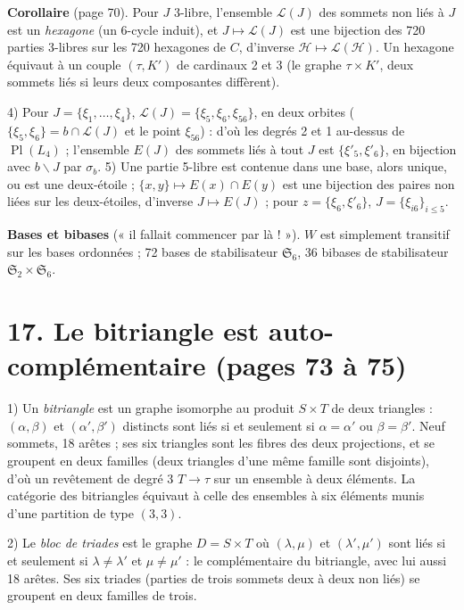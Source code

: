 \documentclass[11pt,a4paper]{article}
\begin{document}
\textbf{Corollaire} (page 70). Pour $J$ 3-libre, l'ensemble $\mathcal{L}(J)$
des sommets non liés à $J$ est un \emph{hexagone} (un 6-cycle induit), et $J
\mapsto \mathcal{L}(J)$ est une bijection des 720 parties 3-libres sur les 720
hexagones de $C$, d'inverse $\mathcal{H} \mapsto \mathcal{L}(\mathcal{H})$. Un
hexagone équivaut à un couple $(\tau, K')$ de cardinaux 2 et 3 (le graphe
$\tau \times K'$, deux sommets liés si leurs deux composantes diffèrent).

4) Pour $J = \lbrace \xi_1, \ldots, \xi_4\rbrace$, $\mathcal{L}(J) = \lbrace
\xi_5, \xi_6, \xi_{56}\rbrace$, en deux orbites ($\lbrace \xi_5, \xi_6\rbrace =
b \cap \mathcal{L}(J)$ et le point $\xi_{56}$) : d'où les degrés 2 et 1 au-dessus
de $\operatorname{Pl}(L_4)$ ; l'ensemble $E(J)$ des sommets liés à tout $J$ est
$\lbrace \xi'_5, \xi'_6\rbrace$, en bijection avec $b \smallsetminus J$ par
$\sigma_b$. 5) Une partie 5-libre est contenue dans une base, alors unique, ou
est une deux-étoile ; $\lbrace x, y\rbrace \mapsto E(x) \cap E(y)$ est une
bijection des paires non liées sur les deux-étoiles, d'inverse $J \mapsto
E(J)$ ; pour $z = \lbrace \xi_6, \xi'_6\rbrace$, $J = \lbrace \xi_{i6}\rbrace_{i
\leq 5}$.

\textbf{Bases et bibases} (« il fallait commencer par là ! »). $W$ est
simplement transitif sur les bases ordonnées ; 72 bases de stabilisateur
$\mathfrak{S}_6$, 36 bibases de stabilisateur $\mathfrak{S}_2 \times
\mathfrak{S}_6$.

\section*{17. Le bitriangle est auto-complémentaire (pages 73 à 75)}

1) Un \emph{bitriangle} est un graphe isomorphe au produit $S \times T$ de
deux triangles : $(\alpha, \beta)$ et $(\alpha', \beta')$ distincts sont liés
si et seulement si $\alpha = \alpha'$ ou $\beta = \beta'$. Neuf sommets, 18
arêtes ; ses six triangles sont les fibres des deux projections, et se
groupent en deux familles (deux triangles d'une même famille sont disjoints),
d'où un revêtement de degré 3 $T \to \tau$ sur un ensemble à deux éléments.
La catégorie des bitriangles équivaut à celle des ensembles à six éléments
munis d'une partition de type $(3,3)$.

2) Le \emph{bloc de triades} est le graphe $D = S \times T$ où $(\lambda, \mu)$
et $(\lambda', \mu')$ sont liés si et seulement si $\lambda \neq \lambda'$ et $\mu
\neq \mu'$ : le complémentaire du bitriangle, avec lui aussi 18 arêtes. Ses
six triades (parties de trois sommets deux à deux non liés) se groupent en
deux familles de trois.
\end{document}

